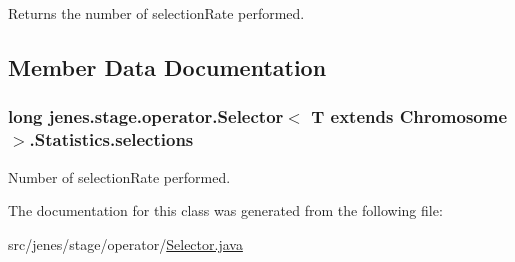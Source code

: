 \begin{DoxyReturn}{Returns}
the number of selection\-Rate performed. 
\end{DoxyReturn}


\subsection{Member Data Documentation}
\hypertarget{classjenes_1_1stage_1_1operator_1_1_selector_3_01_t_01extends_01_chromosome_01_4_1_1_statistics_a8308f3f0177bfe79fcbf46bd4ac93cc4}{
\subsubsection[{selections}]{\setlength{\rightskip}{0pt plus 5cm}long jenes.\-stage.\-operator.\-Selector$<$ T extends Chromosome $>$.Statistics.\-selections\hspace{0.3cm}{\ttfamily [protected]}}}\label{classjenes_1_1stage_1_1operator_1_1_selector_3_01_t_01extends_01_chromosome_01_4_1_1_statistics_a8308f3f0177bfe79fcbf46bd4ac93cc4}
Number of selection\-Rate performed. 

The documentation for this class was generated from the following file\-:\begin{DoxyCompactItemize}
\item 
src/jenes/stage/operator/\hyperlink{_selector_8java}{Selector.\-java}\end{DoxyCompactItemize}
